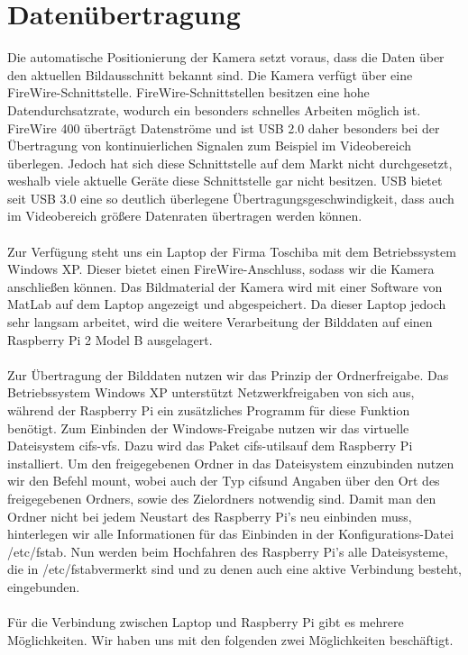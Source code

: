 \documentclass[12pt,a4paper,bibliography=totocnumbered,listof=totocnumbered]{scrartcl}
\begin{document}
\section{Datenübertragung}
Die automatische Positionierung der Kamera setzt voraus, dass die Daten über den aktuellen Bildausschnitt bekannt sind. Die Kamera verfügt über eine FireWire-Schnittstelle. FireWire-Schnittstellen besitzen eine hohe Datendurchsatzrate, wodurch ein besonders schnelles Arbeiten möglich ist. FireWire 400 überträgt Datenströme und ist USB 2.0 daher besonders bei der Übertragung von kontinuierlichen Signalen zum Beispiel im Videobereich überlegen. Jedoch hat sich diese Schnittstelle auf dem Markt nicht durchgesetzt, weshalb viele aktuelle Geräte diese Schnittstelle gar nicht besitzen. USB bietet seit USB 3.0 eine so deutlich überlegene Übertragungsgeschwindigkeit, dass auch im Videobereich größere Datenraten übertragen werden können. \\ \\
Zur Verfügung steht uns ein Laptop der Firma Toschiba mit dem Betriebssystem Windows XP. Dieser bietet einen FireWire-Anschluss, sodass wir die Kamera anschließen können. Das Bildmaterial der Kamera wird mit einer Software von MatLab auf dem Laptop angezeigt und abgespeichert. Da dieser Laptop jedoch sehr langsam arbeitet, wird die weitere Verarbeitung der Bilddaten auf einen Raspberry Pi 2 Model B ausgelagert. \\ \\
Zur Übertragung der Bilddaten nutzen wir das Prinzip der Ordnerfreigabe. Das Betriebssystem Windows XP unterstützt Netzwerkfreigaben von sich aus, während der Raspberry Pi ein zusätzliches Programm für diese Funktion benötigt. Zum Einbinden der Windows-Freigabe nutzen wir das virtuelle Dateisystem \glqq cifs-vfs\grqq. Dazu wird das Paket \glqq cifs-utils\grqq auf dem Raspberry Pi installiert. Um den freigegebenen Ordner in das Dateisystem einzubinden nutzen wir den Befehl \glqq mount\grqq, wobei auch der Typ \glqq cifs\grqq und Angaben über den Ort des freigegebenen Ordners, sowie des Zielordners notwendig sind. Damit man den Ordner nicht bei jedem Neustart des Raspberry Pi's neu einbinden muss, hinterlegen wir alle Informationen für das Einbinden in der Konfigurations-Datei \glqq /etc/fstab\grqq. Nun werden beim Hochfahren des Raspberry Pi's alle Dateisysteme, die in \glqq /etc/fstab\grqq vermerkt sind und zu denen auch eine aktive Verbindung besteht, eingebunden. \\ \\
Für die Verbindung zwischen Laptop und Raspberry Pi gibt es mehrere Möglichkeiten. Wir haben uns mit den folgenden zwei Möglichkeiten beschäftigt. \\ \\
\end{document}
